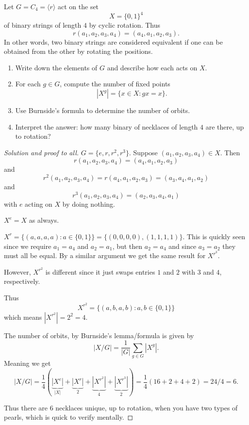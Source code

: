 \begin{prob}
    Let $G = C_4 = \langle r \rangle$ act on the set 
    \[
        X = \{0,1\}^4
    \]
    of binary strings of length $4$ by cyclic rotation.
    Thus 
    \[
        r(a_1,a_2,a_3,a_4) = (a_4,a_1,a_2,a_3).
    \]
    In other words, two binary strings are considered 
    equivalent if one can be obtained from the other by 
    rotating the positions.

    \begin{enumerate}[label=\alph*)]
        \item Write down the elements of $G$ and describe how 
            each acts on $X$. 
        \item For each $g \in G$, compute the number of fixed 
            points 
            \[
                |X^g| = \{x \in X : gx = x\}.
            \]
        \item Use Burnside's formula to determine the number 
            of orbits. 
        \item Interpret the answer: how many 
            binary of necklaces of length $4$ are there, up to 
            rotation?
    \end{enumerate}
\end{prob}
\begin{proof}[Solution and proof to all]
    $G = \{e, r, r^2, r^3\}$.
    Suppose $(a_1,a_2,a_3,a_4) \in X$. Then 
    \[
        r(a_1,a_2,a_3,a_4) = (a_4,a_1,a_2,a_3)
    \]
    and 
    \[
        r^2(a_1,a_2,a_3,a_4) = r(a_4,a_1,a_2,a_3) 
        = (a_3,a_4,a_1,a_2)
    \]
    and 
    \[
        r^3(a_1,a_2,a_3,a_4) = (a_2,a_3,a_4,a_1)
    \]
    with $e$ acting on $X$ by doing nothing.

    $X^e = X$ as always. 

    $X^r = \{(a,a,a,a) : a \in \{0,1\}\} = \{(0,0,0,0),(1,1,1,1)\}$. 
    This is quickly seen since we require $a_1 = a_4$ and 
    $a_2 = a_1$, but then $a_2 = a_4$ and since $a_3 = a_2$ they 
    must all be equal.
    By a similar argument we get the same result for 
    $X^{r^3}$. 

    However, $X^{r^2}$ is different since it just swaps 
    entries $1$ and $2$ with $3$ and $4$, respectively. 

    Thus 
    \[
        X^{r^2} = \{(a,b,a,b) : a,b \in \{0,1\}\}
    \]
    which means $|X^{r^2}| = 2^2 = 4$.

    The number of orbits, by Burnside's lemma/formula is given by 
    \[
        |X/G| = \frac{1}{|G|}\displaystyle\sum_{g \in G}
        |X^g|.
    \]
    Meaning we get 
    \[
        |X/G| = \frac{1}{4} 
        (\underbrace{|X^e|}_{|X|} + \underbrace{|X^r|}_{2} + 
        \underbrace{|X^{r^2}|}_{4} + \underbrace{|X^{r^3}|}_{2})
        = \frac{1}{4}(16 + 2 + 4 + 2) = 24/4 = 6.
    \]

    Thus there are $6$ necklaces unique, up to rotation, when 
    you have two types of pearls, which is quick to verify mentally. 
\end{proof}

